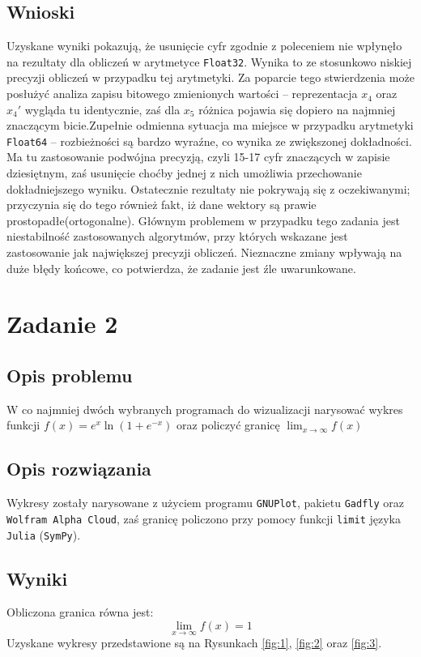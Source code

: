 \documentclass{classrep}
\begin{document}
	\subsection{Wnioski}
		Uzyskane wyniki pokazują, że usunięcie cyfr zgodnie z poleceniem nie wpłynęło na rezultaty dla obliczeń w arytmetyce \texttt{Float32}. 
		Wynika to ze stosunkowo niskiej precyzji obliczeń w przypadku tej arytmetyki. Za poparcie tego stwierdzenia może posłużyć analiza zapisu bitowego zmienionych wartości -- reprezentacja $x_4$ oraz $x_4'$ wygląda tu identycznie, zaś dla $x_5$ różnica pojawia się dopiero na najmniej znaczącym bicie.Zupełnie odmienna sytuacja ma miejsce w przypadku arytmetyki \texttt{Float64} -- rozbieżności są bardzo wyraźne, co wynika ze zwiększonej dokładności. Ma tu zastosowanie podwójna precyzją, czyli 15-17 cyfr znaczących w zapisie dziesiętnym, zaś usunięcie choćby jednej z nich umożliwia przechowanie dokładniejszego wyniku. Ostatecznie rezultaty nie pokrywają się z oczekiwanymi; przyczynia się do tego również fakt, iż dane wektory są prawie prostopadłe(ortogonalne). Głównym problemem w przypadku tego zadania jest niestabilność zastosowanych algorytmów, przy których wskazane jest zastosowanie jak największej precyzji obliczeń. Nieznaczne zmiany wpływają na duże błędy końcowe, co potwierdza, że zadanie jest źle uwarunkowane.
\section{Zadanie 2}
	\subsection{Opis problemu}
		W co najmniej dwóch wybranych programach do wizualizacji narysować wykres funkcji $f(x)=e^{x}\ln(1+e^{-x})$ oraz policzyć granicę $\lim_{x \to \infty} f(x)$
		
	\subsection{Opis rozwiązania}
		Wykresy zostały narysowane z użyciem programu \texttt{GNUPlot}, pakietu \texttt{Gadfly} oraz \texttt{Wolfram Alpha Cloud}, zaś granicę policzono przy pomocy funkcji \texttt{limit} języka \texttt{Julia} (\texttt{SymPy}).
	\subsection{Wyniki}
		Obliczona granica równa jest: $$\lim_{x \to \infty} f(x) = 1$$	
		Uzyskane wykresy przedstawione są na Rysunkach \ref{fig:1}, \ref{fig:2} oraz \ref{fig:3}.
		
\end{document}
